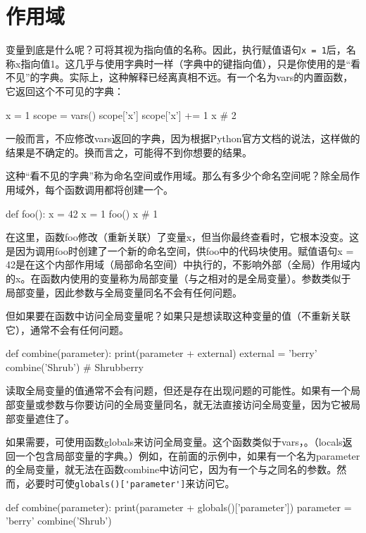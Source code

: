 \section{作用域}
变量到底是什么呢？可将其视为指向值的名称。因此，执行赋值语句\verb|x = 1|后，名称x指向值1。这几乎与使用字典时一样（字典中的键指向值），只是你使用的是“看不见”的字典。实际上，这种解释已经离真相不远。有一个名为vars的内置函数，它返回这个不可见的字典：
\begin{pyc}
x = 1
scope = vars()
scope['x']
scope['x'] += 1
x  # 2
\end{pyc}
\begin{tcolorbox}[title=警告]
    一般而言，不应修改vars返回的字典，因为根据Python官方文档的说法，这样做的结果是不确定的。换而言之，可能得不到你想要的结果。
\end{tcolorbox}
这种“看不见的字典”称为命名空间或作用域。那么有多少个命名空间呢？除全局作用域外，每个函数调用都将创建一个。
\begin{pyc}
def foo(): x = 42
x = 1
foo()
x  # 1
\end{pyc}

在这里，函数foo修改（重新关联）了变量x，但当你最终查看时，它根本没变。这是因为调用foo时创建了一个新的命名空间，供foo中的代码块使用。赋值语句x = 42是在这个内部作用域（局部命名空间）中执行的，不影响外部（全局）作用域内的x。在函数内使用的变量称为局部变量（与之相对的是全局变量）。参数类似于局部变量，因此参数与全局变量同名不会有任何问题。

但如果要在函数中访问全局变量呢？如果只是想读取这种变量的值（不重新关联它），通常不会有任何问题。
\begin{pyc}
def combine(parameter): print(parameter + external)
external = 'berry'
combine('Shrub')  # Shrubberry
\end{pyc}


\begin{tcolorbox}[title=遮盖的问题, breakable]
读取全局变量的值通常不会有问题，但还是存在出现问题的可能性。如果有一个局部变量或参数与你要访问的全局变量同名，就无法直接访问全局变量，因为它被局部变量遮住了。

如果需要，可使用函数globals来访问全局变量。这个函数类似于vars，。（locals返回一个包含局部变量的字典。）例如，在前面的示例中，如果有一个名为parameter的全局变量，就无法在函数combine中访问它，因为有一个与之同名的参数。然而，必要时可使\verb|globals()['parameter']|来访问它。

\begin{pyc}
def combine(parameter):
    print(parameter + globals()['parameter'])
parameter = 'berry'
combine('Shrub')
\end{pyc}
\end{tcolorbox}

